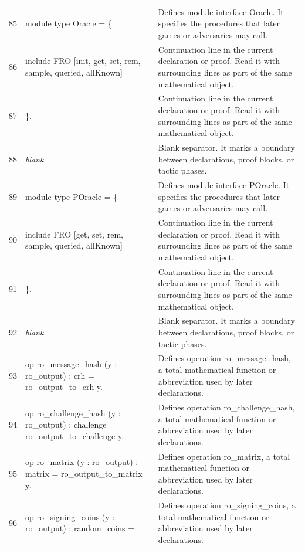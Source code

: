 \documentclass[10pt]{article}
\begin{document}
\begin{longtable}{r L{0.53\textwidth} L{0.37\textwidth}}
85 & {\ttfamily\scriptsize module type Oracle = \{} & Defines module interface Oracle.  It specifies the procedures that later games or adversaries may call. \\
86 & {\ttfamily\scriptsize   include FRO [init, get, set, rem, sample, queried, allKnown]} & Continuation line in the current declaration or proof.  Read it with surrounding lines as part of the same mathematical object. \\
87 & {\ttfamily\scriptsize \}.} & Continuation line in the current declaration or proof.  Read it with surrounding lines as part of the same mathematical object. \\
88 & {\ttfamily\scriptsize \emph{blank}} & Blank separator.  It marks a boundary between declarations, proof blocks, or tactic phases. \\
89 & {\ttfamily\scriptsize module type POracle = \{} & Defines module interface POracle.  It specifies the procedures that later games or adversaries may call. \\
90 & {\ttfamily\scriptsize   include FRO [get, set, rem, sample, queried, allKnown]} & Continuation line in the current declaration or proof.  Read it with surrounding lines as part of the same mathematical object. \\
91 & {\ttfamily\scriptsize \}.} & Continuation line in the current declaration or proof.  Read it with surrounding lines as part of the same mathematical object. \\
92 & {\ttfamily\scriptsize \emph{blank}} & Blank separator.  It marks a boundary between declarations, proof blocks, or tactic phases. \\
93 & {\ttfamily\scriptsize op ro\_message\_hash (y : ro\_output) : crh = ro\_output\_to\_crh y.} & Defines operation ro\_message\_hash, a total mathematical function or abbreviation used by later declarations. \\
94 & {\ttfamily\scriptsize op ro\_challenge\_hash (y : ro\_output) : challenge = ro\_output\_to\_challenge y.} & Defines operation ro\_challenge\_hash, a total mathematical function or abbreviation used by later declarations. \\
95 & {\ttfamily\scriptsize op ro\_matrix (y : ro\_output) : matrix = ro\_output\_to\_matrix y.} & Defines operation ro\_matrix, a total mathematical function or abbreviation used by later declarations. \\
96 & {\ttfamily\scriptsize op ro\_signing\_coins (y : ro\_output) : random\_coins =} & Defines operation ro\_signing\_coins, a total mathematical function or abbreviation used by later declarations. \\

\end{longtable}
\end{document}
